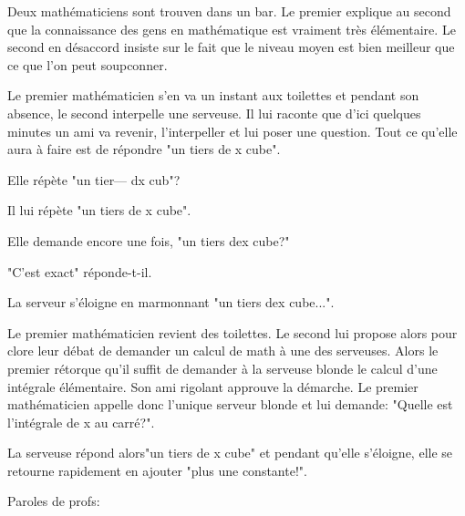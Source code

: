 Deux mathématiciens sont trouven dans un bar. Le premier explique au second que la connaissance des gens en mathématique est vraiment très élémentaire. Le second en désaccord insiste sur le fait que le niveau moyen est bien meilleur que ce que l'on peut soupconner.

Le premier mathématicien s'en va un instant aux toilettes et pendant son absence, le second interpelle une serveuse. Il lui raconte que d'ici quelques minutes un ami va revenir, l'interpeller et lui poser une question. Tout ce qu'elle aura à faire est de répondre "un tiers de x cube".

Elle répète "un tier--- dx cub"?

Il lui répète "un tiers de x cube".

Elle demande encore une fois, "un tiers dex cube?"

"C'est exact" réponde-t-il.

La serveur s'éloigne en marmonnant "un tiers dex cube...".

Le premier mathématicien revient des toilettes. Le second lui propose alors pour clore leur débat de demander un calcul de math à une des serveuses. Alors le premier rétorque qu'il suffit de demander à la serveuse blonde le calcul d'une intégrale élémentaire. Son ami rigolant approuve la démarche. Le premier mathématicien appelle donc l'unique serveur blonde et lui demande: "Quelle est l'intégrale de x au carré?".

La serveuse répond alors"un tiers de x cube" et pendant qu'elle s'éloigne, elle se retourne rapidement en ajouter "plus une constante!".

	\begin{center}\underline{\hspace{5 cm}}\end{center}

Paroles de profs:

